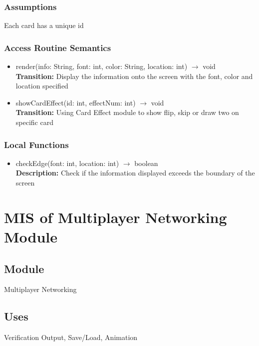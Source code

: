 \documentclass[12pt, titlepage]{article}
\begin{document}
\subsubsection{Assumptions}
\hspace{1.5em}Each card has a unique id


\subsubsection{Access Routine Semantics}

\begin{itemize}
\item render(info: String, font: int, color: String, location: int)
$\rightarrow$ void\\
\textbf{Transition:} Display the information onto the screen with the font, color and location specified

\item showCardEffect(id: int, effectNum: int) $\rightarrow$ void\\
\textbf{Transition:} Using Card Effect module to show flip, skip or draw two on specific card 	

\end{itemize}


\subsubsection{Local Functions}
\begin{itemize}
\item checkEdge(font: int, location: int) $\rightarrow$ boolean\\
\textbf{Description:} Check if the information displayed exceeds the boundary of the screen
\end{itemize}


\section{MIS of Multiplayer Networking Module} 
\label{MNM}

\subsection{Module}
\hspace{1.5em}Multiplayer Networking

\subsection{Uses}
\hspace{1.5em}Verification Output, Save/Load, Animation
\end{document}
